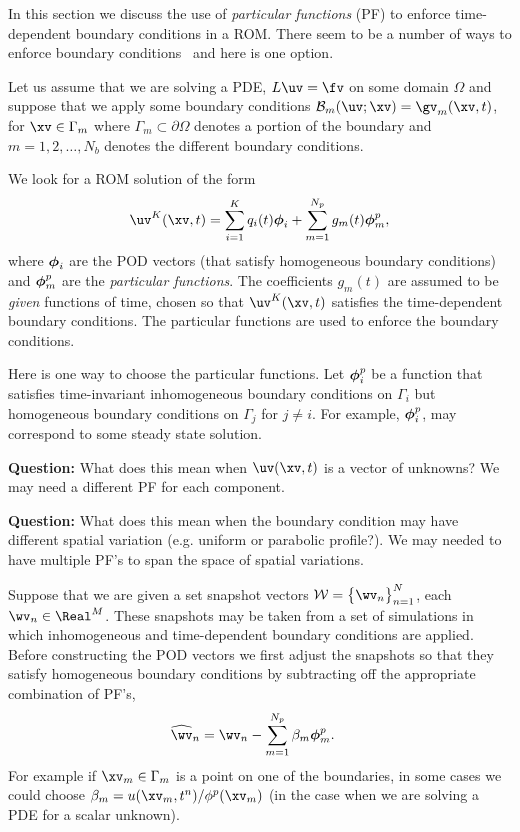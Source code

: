  \label{sec:particularFunctions}


In this section we discuss the use of {\em particular functions} (PF) to enforce time-dependent boundary
conditions in a ROM. There seem to be a number of ways to enforce boundary conditions~\cite{Gunzburger}
and here is one option.

Let us assume that we are solving a PDE, $L\uv=\fv$ on some domain $\Omega$ and suppose that we 
apply some boundary conditions $\Bc_m(\uv;\xv)=\gv_m(\xv,t)$, for $\xv\in\Gamma_m$ where $\Gamma_m \subset \partial\Omega$ denotes
a portion of the boundary and $m=1,2,\ldots,N_b$ denotes the different boundary conditions. 


We look for a ROM solution of the form 
\begin{align}
   \uv^K(\xv,t) = \sum_{i=1}^K q_i(t) \phiv_i  +  \sum_{m=1}^{N_p} g_m(t) \phiv_m^p , 
\end{align}
where $\boldsymbol{\phi}_i$ are the POD vectors (that satisfy homogeneous boundary conditions) 
and $\boldsymbol{\phi}_m^p$ are the {\em particular functions}. The coefficients $g_m(t)$ are assumed
to be {\em given} functions of time, chosen so that $\uv^K(\xv,t)$ satisfies the time-dependent boundary conditions.
The particular functions are used to enforce the boundary conditions.


Here is one way to choose the particular functions. Let $\boldsymbol{\phi}_i^p$ be a function that 
satisfies time-invariant inhomogeneous boundary conditions on $\Gamma_i$ but homogeneous boundary 
conditions on $\Gamma_j$ for $j\ne i$. For example, $\boldsymbol{\phi}_i^p$, may correspond to some steady 
state solution.

{\bf Question:} What does this mean when $\uv(\xv,t)$ is a vector of unknowns? We may need a different PF for each component.

{\bf Question:} What does this mean when the boundary condition may have different spatial variation (e.g. uniform or parabolic profile?).
   We may needed to have multiple PF's to span the space of spatial variations.


Suppose that we are given a set snapshot vectors $\Wc = \big\{ \wv_n\big\}_{n=1}^N$, each $\wv_n \in \Real^M$.
These snapshots may be taken from a set of simulations in which inhomogeneous and time-dependent
boundary conditions are applied. Before constructing the POD vectors we first adjust the snapshots
so that they satisfy homogeneous boundary conditions by subtracting off the appropriate combination
of PF's, 
\begin{align*}
    \widehat{\wv}_n &= \wv_n - \sum_{m=1}^{N_p} \beta_m \phiv_m^p.
\end{align*}
For example if $\xv_m\in\Gamma_m$ is a point on one of the boundaries,
in some cases we could choose $\beta_m=u(\xv_m,t^n)/\phi^p(\xv_m)$ (in the case when we are solving a PDE for a scalar unknown). 

